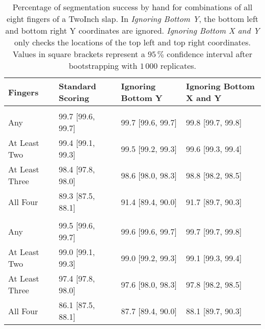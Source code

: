 \documentclass[]{article}
\begin{document}
\begin{table}[!h]

\caption{\label{tab:twoinch-per-hand-all-ci}Percentage of segmentation success by hand for combinations of all eight fingers of a TwoInch slap. In \textit{Ignoring Bottom Y}, the bottom left and bottom right Y coordinates are ignored. \textit{Ignoring Bottom X and Y} only checks the locations of the top left and top right coordinates. Values in square brackets represent a \(95\,\%\) confidence interval after bootstrapping with \(1\,000\) replicates.}
\centering
\begin{tabular}{llll}
\toprule
Fingers & Standard Scoring & Ignoring Bottom Y & Ignoring Bottom X and Y\\
\midrule
\addlinespace[0.3em]
\multicolumn{4}{l}{\textbf{Right}}\\
\rowcolor{gray!6}  \hspace{1em}Any & 99.7 [99.6, 99.7] & 99.7 [99.6, 99.7] & 99.8 [99.7, 99.8]\\
\hspace{1em}At Least Two & 99.4 [99.1, 99.3] & 99.5 [99.2, 99.3] & 99.6 [99.3, 99.4]\\
\rowcolor{gray!6}  \hspace{1em}At Least Three & 98.4 [97.8, 98.0] & 98.6 [98.0, 98.3] & 98.8 [98.2, 98.5]\\
\hspace{1em}All Four & 89.3 [87.5, 88.1] & 91.4 [89.4, 90.0] & 91.7 [89.7, 90.3]\\
\addlinespace[0.3em]
\multicolumn{4}{l}{\textbf{Left}}\\
\rowcolor{gray!6}  \hspace{1em}Any & 99.5 [99.6, 99.7] & 99.6 [99.6, 99.7] & 99.7 [99.7, 99.8]\\
\hspace{1em}At Least Two & 99.0 [99.1, 99.3] & 99.0 [99.2, 99.3] & 99.1 [99.3, 99.4]\\
\rowcolor{gray!6}  \hspace{1em}At Least Three & 97.4 [97.8, 98.0] & 97.6 [98.0, 98.3] & 97.8 [98.2, 98.5]\\
\hspace{1em}All Four & 86.1 [87.5, 88.1] & 87.7 [89.4, 90.0] & 88.1 [89.7, 90.3]\\
\bottomrule
\end{tabular}
\end{table}
\end{document}
